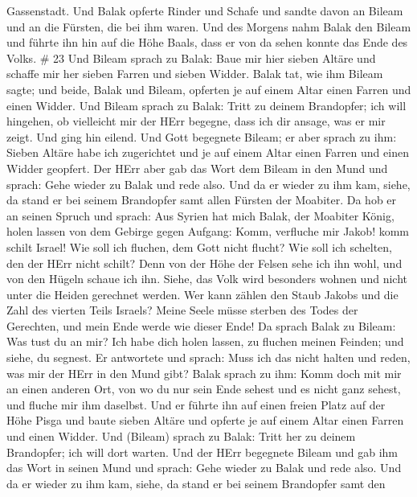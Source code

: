 Gassenstadt.  Und Balak opferte Rinder und Schafe und
sandte davon an Bileam und an die Fürsten, die bei ihm waren.
 Und des Morgens nahm Balak den Bileam und führte ihn hin
auf die Höhe Baals, dass er von da sehen konnte das Ende des Volks. \#
23  Und Bileam sprach zu Balak: Baue mir hier sieben Altäre
und schaffe mir her sieben Farren und sieben Widder.  Balak
tat, wie ihm Bileam sagte; und beide, Balak und Bileam, opferten je auf
einem Altar einen Farren und einen Widder.  Und Bileam
sprach zu Balak: Tritt zu deinem Brandopfer; ich will hingehen, ob
vielleicht mir der HErr begegne, dass ich dir ansage, was er mir zeigt.
Und ging hin eilend.  Und Gott begegnete Bileam; er aber
sprach zu ihm: Sieben Altäre habe ich zugerichtet und je auf einem Altar
einen Farren und einen Widder geopfert.  Der HErr aber gab
das Wort dem Bileam in den Mund und sprach: Gehe wieder zu Balak und
rede also.  Und da er wieder zu ihm kam, siehe, da stand er
bei seinem Brandopfer samt allen Fürsten der Moabiter.  Da
hob er an seinen Spruch und sprach: Aus Syrien hat mich Balak, der
Moabiter König, holen lassen von dem Gebirge gegen Aufgang: Komm,
verfluche mir Jakob! komm schilt Israel!  Wie soll ich
fluchen, dem Gott nicht flucht? Wie soll ich schelten, den der HErr
nicht schilt?  Denn von der Höhe der Felsen sehe ich ihn
wohl, und von den Hügeln schaue ich ihn. Siehe, das Volk wird besonders
wohnen und nicht unter die Heiden gerechnet werden.  Wer
kann zählen den Staub Jakobs und die Zahl des vierten Teils Israels?
Meine Seele müsse sterben des Todes der Gerechten, und mein Ende werde
wie dieser Ende!  Da sprach Balak zu Bileam: Was tust du an
mir? Ich habe dich holen lassen, zu fluchen meinen Feinden; und siehe,
du segnest.  Er antwortete und sprach: Muss ich das nicht
halten und reden, was mir der HErr in den Mund gibt?  Balak
sprach zu ihm: Komm doch mit mir an einen anderen Ort, von wo du nur
sein Ende sehest und es nicht ganz sehest, und fluche mir ihm daselbst.
 Und er führte ihn auf einen freien Platz auf der Höhe
Pisga und baute sieben Altäre und opferte je auf einem Altar einen
Farren und einen Widder.  Und (Bileam) sprach zu Balak:
Tritt her zu deinem Brandopfer; ich will dort warten.  Und
der HErr begegnete Bileam und gab ihm das Wort in seinen Mund und
sprach: Gehe wieder zu Balak und rede also.  Und da er
wieder zu ihm kam, siehe, da stand er bei seinem Brandopfer samt den

